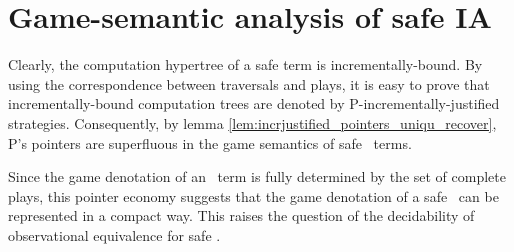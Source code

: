 \section{Game-semantic analysis of safe IA}
Clearly, the computation hypertree of a safe term is incrementally-bound.
By using the correspondence between traversals and plays, it is easy
to prove that incrementally-bound computation trees are denoted by
P-incrementally-justified strategies. Consequently, by lemma
\ref{lem:incrjustified_pointers_uniqu_recover}, P's pointers are superfluous in the
game semantics of safe \ialgol\ terms.

Since the game denotation of an \ialgol\ term is fully determined by
the set of complete plays, this pointer economy suggests that the
game denotation of a safe \ialgol\ can be represented in a compact
way. This raises the question of the decidability of observational
equivalence for safe \ialgol.
